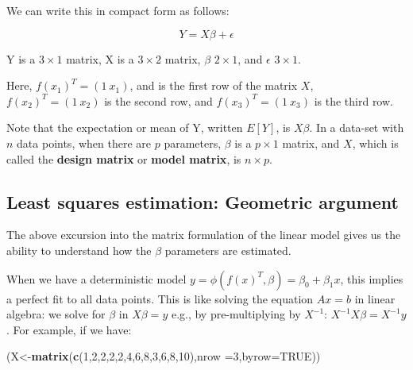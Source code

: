 \documentclass[12pt,]{krantz}
\newenvironment{Shaded}{\begin{snugshade}}{\end{snugshade}}
\newcommand{\DataTypeTok}[1]{\textcolor[rgb]{0.13,0.29,0.53}{#1}}
\newcommand{\DecValTok}[1]{\textcolor[rgb]{0.00,0.00,0.81}{#1}}
\newcommand{\KeywordTok}[1]{\textcolor[rgb]{0.13,0.29,0.53}{\textbf{#1}}}
\newcommand{\NormalTok}[1]{#1}
\newcommand{\OtherTok}[1]{\textcolor[rgb]{0.56,0.35,0.01}{#1}}
\begin{document}
We can write this in compact form as follows:

\begin{equation}
Y = X \beta + \epsilon
\end{equation}

Y is a \(3\times 1\) matrix, X is a \(3\times 2\) matrix, \(\beta\) \(2\times 1\), and \(\epsilon\) \(3\times 1\).

Here, \(f(x_1)^T = (1~x_1)\), and is the first row of the matrix \(X\),
\(f(x_2)^T = (1~x_2)\) is the second row, and
\(f(x_3)^T = (1~x_3)\) is the third row.

Note that the expectation or mean of Y, written \(E[Y]\), is \(X\beta\). In a data-set with \(n\) data points, when there are \(p\) parameters, \(\beta\) is a \(p\times 1\) matrix, and \(X\), which is called the \textbf{design matrix} or \textbf{model matrix}, is \(n\times p\).

\hypertarget{least-squares-estimation-geometric-argument}{%
\subsection{Least squares estimation: Geometric argument}\label{least-squares-estimation-geometric-argument}}

The above excursion into the matrix formulation of the linear model gives us the ability to understand how the \(\beta\) parameters are estimated.

When we have a deterministic model \(y=\phi(f(x)^T,\beta)=\beta_0+\beta_1x\), this implies a perfect fit to all data points.
This is like solving the equation \(Ax=b\) in linear algebra: we solve for \(\beta\) in \(X\beta=y\) e.g., by pre-multiplying by \(X^{-1}\): \(X^{-1}X\beta=X^{-1}y\). For example, if we have:

\begin{Shaded}
\begin{Highlighting}[]
\NormalTok{(X<-}\KeywordTok{matrix}\NormalTok{(}\KeywordTok{c}\NormalTok{(}\DecValTok{1}\NormalTok{,}\DecValTok{2}\NormalTok{,}\DecValTok{2}\NormalTok{,}\DecValTok{2}\NormalTok{,}\DecValTok{2}\NormalTok{,}\DecValTok{4}\NormalTok{,}\DecValTok{6}\NormalTok{,}\DecValTok{8}\NormalTok{,}\DecValTok{3}\NormalTok{,}\DecValTok{6}\NormalTok{,}\DecValTok{8}\NormalTok{,}\DecValTok{10}\NormalTok{),}\DataTypeTok{nrow =}\DecValTok{3}\NormalTok{,}\DataTypeTok{byrow=}\OtherTok{TRUE}\NormalTok{))}
\end{Highlighting}
\end{Shaded}
\end{document}
